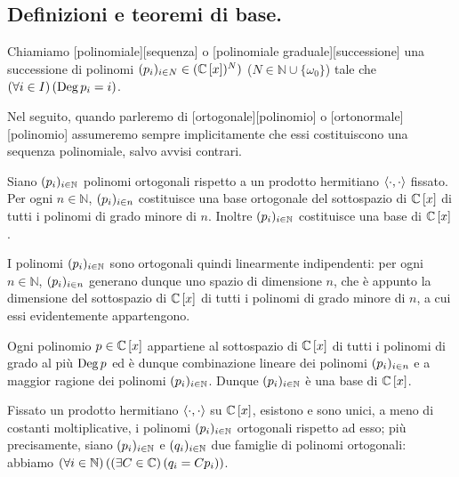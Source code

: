 \subsection{Definizioni e teoremi di base.}
\label{IstituzioniDiAnalisiNumerica_PolinomiOrtogonali}
\begin{Definition}
	Chiamiamo [polinomiale][sequenza] o [polinomiale graduale][successione] una successione di polinomi $(p_i)_{i \in N} \in (\mathbb{C} \left [ x \right ])^N)$ ($N \in \mathbb{N} \cup \lbrace \omega_0 \rbrace$) tale che $\left ( \forall i \in I \right ) \left ( \operatorname{\operatorname{Deg}}{p_i} = i \right )$.
\end{Definition}
\par Nel seguito, quando parleremo di [ortogonale][polinomio] o [ortonormale][polinomio] assumeremo sempre implicitamente che essi costituiscono una sequenza polinomiale, salvo avvisi contrari.
\begin{Theorem}
	Siano $(p_i)_{i \in \mathbb{N}}$ polinomi ortogonali rispetto a un prodotto hermitiano $\left \langle \cdot , \cdot \right \rangle$ fissato. Per ogni $n \in \mathbb{N}$, $(p_i)_{i \in n}$ costituisce una base ortogonale del sottospazio di $\mathbb{C} \left [ x \right ]$ di tutti i polinomi di grado minore di $n$. Inoltre $(p_i)_{i \in \mathbb{N}}$ costituisce una base di $\mathbb{C} \left [ x \right ]$.
\end{Theorem}
\Proof I polinomi $(p_i)_{i \in \mathbb{N}}$ sono ortogonali quindi linearmente indipendenti: per ogni $n \in \mathbb{N}$, $(p_i)_{i \in n}$ generano dunque uno spazio di dimensione $n$, che \`e appunto la dimensione del sottospazio di $\mathbb{C} \left [ x \right ]$ di tutti i polinomi di grado minore di $n$, a cui essi evidentemente appartengono.
\par Ogni polinomio $p \in \mathbb{C} \left [ x \right ]$ appartiene al sottospazio di $\mathbb{C} \left [ x \right ]$ di tutti i polinomi di grado al pi\`u $\operatorname{\operatorname{Deg}}{p}$ ed \`e dunque combinazione lineare dei polinomi $(p_i)_{i \in n}$ e a maggior ragione dei polinomi $(p_i)_{i \in \mathbb{N}}$. Dunque $(p_i)_{i \in \mathbb{N}}$ \`e una base di $\mathbb{C} \left [ x \right ]$. \EndProof
\begin{Corollary}
	Fissato un prodotto hermitiano $\left \langle \cdot , \cdot \right \rangle$ su $\mathbb{C} \left [ x \right ]$, esistono e sono unici, a meno di costanti moltiplicative, i polinomi $(p_i)_{i \in \mathbb{N}}$ ortogonali rispetto ad esso; pi\`u precisamente, siano $(p_i)_{i \in \mathbb{N}}$ e $(q_i)_{i \in \mathbb{N}}$ due famiglie di polinomi ortogonali: abbiamo $\left ( \forall i \in \mathbb{N} \right ) \left ( \left ( \exists C \in \mathbb{C} \right ) \left ( q_i = C p_i \right ) \right )$.
\end{Corollary}
